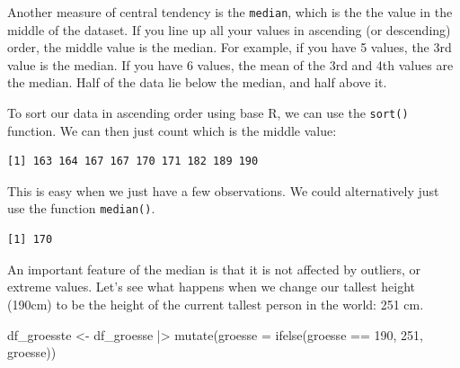 \documentclass[
  letterpaper,
  DIV=11,
  numbers=noendperiod]{scrartcl}
\newenvironment{Shaded}{\begin{snugshade}}{\end{snugshade}}
\newcommand{\AttributeTok}[1]{\textcolor[rgb]{0.40,0.45,0.13}{#1}}
\newcommand{\DecValTok}[1]{\textcolor[rgb]{0.68,0.00,0.00}{#1}}
\newcommand{\FunctionTok}[1]{\textcolor[rgb]{0.28,0.35,0.67}{#1}}
\newcommand{\NormalTok}[1]{\textcolor[rgb]{0.00,0.23,0.31}{#1}}
\newcommand{\OtherTok}[1]{\textcolor[rgb]{0.00,0.23,0.31}{#1}}
\newcommand{\SpecialCharTok}[1]{\textcolor[rgb]{0.37,0.37,0.37}{#1}}
\begin{document}
Another measure of central tendency is the \texttt{median}, which is the
the value in the middle of the dataset. If you line up all your values
in ascending (or descending) order, the middle value is the median. For
example, if you have 5 values, the 3rd value is the median. If you have
6 values, the mean of the 3rd and 4th values are the median. Half of the
data lie below the median, and half above it.

To sort our data in ascending order using base R, we can use the
\texttt{sort()} function. We can then just count which is the middle
value:

\begin{Shaded}
\end{Shaded}

\begin{verbatim}
[1] 163 164 167 167 170 171 182 189 190
\end{verbatim}

This is easy when we just have a few observations. We could
alternatively just use the function \texttt{median()}.

\begin{Shaded}
\end{Shaded}

\begin{verbatim}
[1] 170
\end{verbatim}

An important feature of the median is that it is not affected by
outliers, or extreme values. Let's see what happens when we change our
tallest height (190cm) to be the height of the current tallest person in
the world: 251 cm.

\begin{Shaded}
\begin{Highlighting}[]
\NormalTok{df\_groesste }\OtherTok{\textless{}{-}}\NormalTok{ df\_groesse }\SpecialCharTok{|\textgreater{}} \FunctionTok{mutate}\NormalTok{(}\AttributeTok{groesse =} \FunctionTok{ifelse}\NormalTok{(groesse }\SpecialCharTok{==} \DecValTok{190}\NormalTok{, }\DecValTok{251}\NormalTok{, groesse))}
\end{Highlighting}
\end{Shaded}
\end{document}
